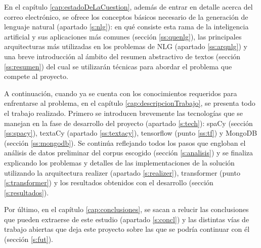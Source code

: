En el capítulo \ref{cap:estadoDeLaCuestion}, además de entrar en detalle acerca del correo electrónico, se ofrece los conceptos básicos necesario de la generación de lenguaje natural (apartado \ref{s:nlg}): en qué consiste esta rama de la inteligencia artificial y sus aplicaciones más comunes (sección \ref{ss:quenlg}), las principales arquitecturas más utilizadas en los problemas de NLG (apartado \ref{ss:arqnlg}) y una breve introducción al ámbito del resumen abstractivo de textos (sección \ref{ss:resumen}) del cual se utilizarán técnicas para abordar el problema que compete al proyecto.

A continuación, cuando ya se cuenta con los conocimientos requeridos para enfrentarse al problema, en el capítulo \ref{cap:descripcionTrabajo}, se presenta todo el trabajo realizado. Primero se introducen brevemente las tecnologías que se manejan en la fase de desarrollo del proyecto (apartado \ref{s:tech}): spaCy (sección \ref{ss:spacy}), textaCy (apartado \ref{ss:textacy}), tensorflow (punto \ref{ss:tf}) y MongoDB (sección \ref{ss:mongodb}). Se continúa reflejando todos los pasos que engloban el análisis de datos preliminar del corpus escogido (sección \ref{s:analisis}) y se finaliza explicando los problemas y detalles de las implementaciones de la solución utilizando la arquitectura realizer (apartado \ref{s:realizer}), transformer (punto \ref{s:transformer}) y los resultados obtenidos con el desarrollo (sección \ref{s:resultados}).

Por último, en el capítulo \ref{cap:conclusiones}, se sacan a relucir las conclusiones que pueden extraerse de este estudio (apartado \ref{s:concl}) y las distintas vías de trabajo abiertas que deja este proyecto sobre las que se podría continuar con él (sección \ref{s:fut}).
